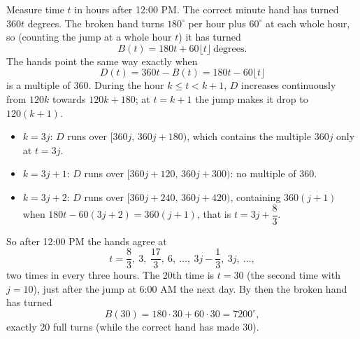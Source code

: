 Measure time $t$ in hours after 12:00 PM. The correct minute hand has turned $360t$ degrees. The broken hand turns $180^\circ$ per hour plus $60^\circ$ at each whole hour, so (counting the jump at a whole hour $t$) it has turned
\[B(t)=180t+60\lfloor t\rfloor\ \text{degrees}.\]
The hands point the same way exactly when
\[D(t)=360t-B(t)=180t-60\lfloor t\rfloor\]
is a multiple of $360$. During the hour $k\le t<k+1$, $D$ increases continuously from $120k$ towards $120k+180$; at $t=k+1$ the jump makes it drop to $120(k+1)$.
\begin{itemize}
\item $k=3j$: $D$ runs over $[360j,\,360j+180)$, which contains the multiple $360j$ only at $t=3j$.
\item $k=3j+1$: $D$ runs over $[360j+120,\,360j+300)$: no multiple of $360$.
\item $k=3j+2$: $D$ runs over $[360j+240,\,360j+420)$, containing $360(j+1)$ when $180t-60(3j+2)=360(j+1)$, that is $t=3j+\dfrac{8}{3}$.
\end{itemize}
So after 12:00 PM the hands agree at
\[t=\dfrac{8}{3},\ 3,\ \dfrac{17}{3},\ 6,\ \ldots,\ 3j-\dfrac{1}{3},\ 3j,\ \ldots,\]
two times in every three hours. The $20$th time is $t=30$ (the second time with $j=10$), just after the jump at 6:00 AM the next day. By then the broken hand has turned
\[B(30)=180\cdot30+60\cdot30=\boxed{7200^\circ},\]
exactly $20$ full turns (while the correct hand has made $30$).

